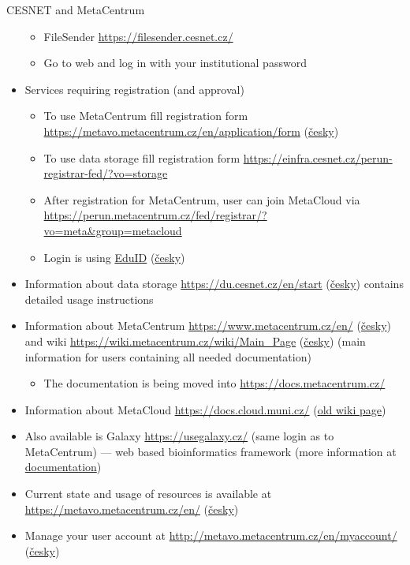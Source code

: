 \documentclass[compress, xelatex, 11pt, xcolor=svgnames, aspectratio=169,
	hyperref={
		bookmarks=true,
		unicode=true,
		colorlinks=true,
		pdftitle={Linux, command line and MetaCentrum},
		plainpages=false,
		pdfauthor={Vojtech Zeisek},
		pdfsubject={Course about use of Linux command line, writing shell scripts and using MetaCentrum of CESNET},
		pdfcreator={XeLaTeX},
		pdfkeywords={Linux, GNU, BASH, shell, command line, MetaCentrum},
		linkcolor=DarkRed, %
		anchorcolor=DarkBlue, %
		citecolor=Indigo, %
		filecolor=NavyBlue, %
		menucolor=DarkMagenta, %
		urlcolor=DarkBlue, %
		},
	url={hyphens, lowtilde} %
	]{beamer}
\begin{document}
\begin{frame}[allowframebreaks]{CESNET and MetaCentrum}
\begin{itemize}
\begin{itemize}
			\item FileSender \url{https://filesender.cesnet.cz/}
			\item Go to web and log in with your institutional password
		\end{itemize}
		\item Services requiring registration (and approval)
		\begin{itemize}
			\item To use MetaCentrum fill registration form \url{https://metavo.metacentrum.cz/en/application/form} (\href{https://metavo.metacentrum.cz/cs/application/}{česky})
			\item To use data storage fill registration form \url{https://einfra.cesnet.cz/perun-registrar-fed/?vo=storage}
			\item After registration for MetaCentrum, user can join MetaCloud via \url{https://perun.metacentrum.cz/fed/registrar/?vo=meta&group=metacloud}
			\item Login is using \href{https://www.eduid.cz/en/index}{EduID} (\href{https://www.eduid.cz/cs/index}{česky})
		\end{itemize}
		\item Information about data storage \url{https://du.cesnet.cz/en/start} (\href{https://du.cesnet.cz/cs/start}{česky}) contains detailed usage instructions
		\item Information about MetaCentrum \url{https://www.metacentrum.cz/en/} (\href{https://www.metacentrum.cz/cs/}{česky}) and wiki \url{https://wiki.metacentrum.cz/wiki/Main_Page} (\href{https://wiki.metacentrum.cz/wiki/Hlavn\%C3\%AD_strana}{česky}) (main information for users containing all needed documentation)
		\begin{itemize}
			\item The documentation is being moved into \url{https://docs.metacentrum.cz/}
		\end{itemize}
		\item Information about MetaCloud \url{https://docs.cloud.muni.cz/} (\href{https://wiki.metacentrum.cz/wiki/Kategorie:Clouds}{old wiki page})
		\item Also available is Galaxy \url{https://usegalaxy.cz/} (same login as to MetaCentrum) --- web based bioinformatics framework (more information at \href{https://docs.metacentrum.cz/related/galaxy/}{documentation})
		\item Current state and usage of resources is available at \url{https://metavo.metacentrum.cz/en/} (\href{https://metavo.metacentrum.cz/cs/}{česky})
		\item Manage your user account at \url{http://metavo.metacentrum.cz/en/myaccount/} (\href{https://metavo.metacentrum.cz/cs/myaccount/}{česky})

\end{itemize}
\end{frame}
\end{document}
